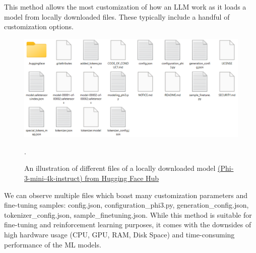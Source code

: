 This method allows the most customization of how an LLM work as it loads a model from locally downloaded files. These typically include a handful of customization options.
\begin{figure}[htbp]
    \centering
    \includegraphics[width=\linewidth]{./figures/Phi-3-mini-4k-instruct-local-files.png}
    \caption{An illustration of different files of a locally downloaded model \href{https://huggingface.co/microsoft/Phi-3-mini-4k-instruct}{(Phi-3-mini-4k-instruct) from Hugging Face Hub}}.
\end{figure}\newline
We can observe multiple files which boast many customization parameters and fine-tuning samples: config.json, configuration\_phi3.py, generation\_config.json, tokenizer\_config.json, sample\_finetuning.json.\newline
While this method is suitable for fine-tuning and reinforcement learning purposes, it comes with the downsides of high hardware usage (CPU, GPU, RAM, Disk Space) and time-consuming performance of the ML models.

